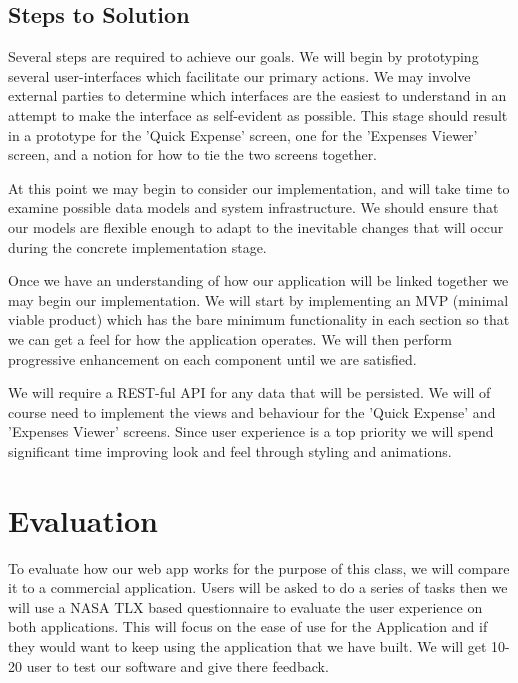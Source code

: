 \documentclass{chi2011}
\begin{document}
\subsection{Steps to Solution}

Several steps are required to achieve our goals.  We will begin by prototyping
several user-interfaces which facilitate our primary actions. We may involve
external parties to determine which interfaces are the easiest to understand in
an attempt to make the interface as self-evident as possible. This stage should
result in a prototype for the 'Quick Expense' screen, one for the 'Expenses
Viewer' screen, and a notion for how to tie the two screens together.

At this point we may begin to consider our implementation, and will take time
to examine possible data models and system infrastructure. We should ensure
that our models are flexible enough to adapt to the inevitable changes that will
occur during the concrete implementation stage.

Once we have an understanding of how our application will be linked together we
may begin our implementation. We will start by implementing an MVP (minimal
viable product) which has the bare minimum functionality in each section so that
we can get a feel for how the application operates. We will then perform
progressive enhancement on each component until we are satisfied.

We will require a REST-ful API for any data that will be persisted. We will of
course need to implement the views and behaviour for the 'Quick Expense' and
'Expenses Viewer' screens. Since user experience is a top priority we will spend
significant time improving look and feel through styling and animations.

\section{Evaluation}
To evaluate how our web app works for the purpose of this class, we will compare
it to a commercial application. Users will be asked to do a series of tasks then
we will use a NASA TLX based questionnaire to evaluate the user experience on
both applications. This will focus on the ease of use for the Application and
if they would want to keep using the application that we have built. We will get
10-20 user to test our software and give there feedback.  
% 
% 
\end{document}
